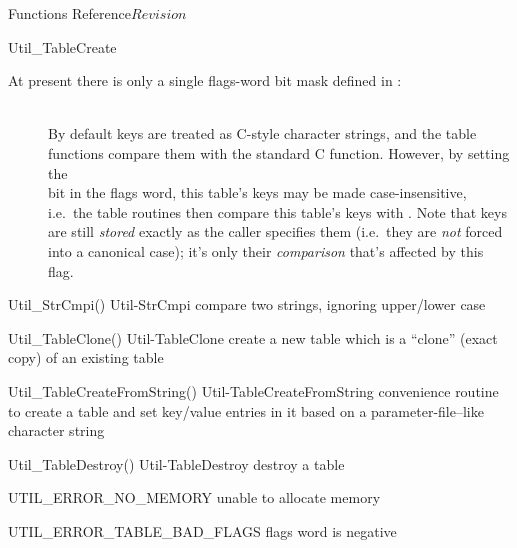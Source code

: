\begin{cactuspart}{ Functions Reference}{}{$Revision$}
\begin{FunctionDescription}{Util\_TableCreate}
\begin{Discussion}
At present there is only a single flags-word bit mask defined
in :
\begin{description}
\item[]\mbox{}\\
        By default keys are treated as C-style character strings,
        and the table functions compare them with the standard C
         function.
        However, by setting the\\
        bit in the flags word, this table's keys may be made
        case-insensitive, i.e.\ the table routines then compare
        this table's keys with .
        Note that keys are still {\em stored\/} exactly as
        the caller specifies them (i.e.\ they are {\em not\/}
        forced into a canonical case); it's only their
        {\em comparison\/} that's affected by this flag.
\end{description}
\end{Discussion}

\begin{SeeAlsoSection}
\begin{SeeAlso2} {Util\_StrCmpi()} {Util-StrCmpi}
compare two strings, ignoring upper/lower case
\end{SeeAlso2}
\begin{SeeAlso2} {Util\_TableClone()} {Util-TableClone}
create a new table which is a ``clone'' (exact copy) of an existing
table
\end{SeeAlso2}
\begin{SeeAlso2} {Util\_TableCreateFromString()} {Util-TableCreateFromString}
convenience routine to create a table and set key/value entries
in it based on a parameter-file--like character string
\end{SeeAlso2}
\begin{SeeAlso2} {Util\_TableDestroy()} {Util-TableDestroy}
destroy a table
\end{SeeAlso2}
\end{SeeAlsoSection}

\begin{ErrorSection}
\begin{Error}{UTIL\_ERROR\_NO\_MEMORY}
unable to allocate memory
\end{Error}
\begin{Error}{UTIL\_ERROR\_TABLE\_BAD\_FLAGS}
flags word is negative
\end{Error}
\end{ErrorSection}


\end{FunctionDescription}
\end{cactuspart}
